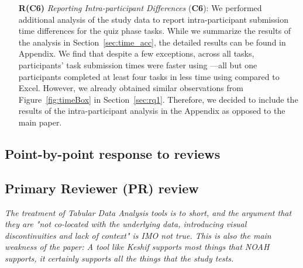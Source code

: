 \begin{itemize}
\item[\textbf{R(C6)}] \textit{Reporting Intra-participant Differences} (\textbf{C6}):
We performed additional analysis of the study data to report intra-participant submission time differences for the quiz phase tasks. While we summarize the results of the analysis in Section~\ref{sec:time_acc}, the detailed results can be found in Appendix. We find that despite a few exceptions, across all tasks, participants' task submission times were faster using \noah---all but one participants completed at least four tasks in less time using \noah compared to Excel. However, we already obtained similar observations from Figure~\ref{fig:timeBox} in Section~\ref{sec:rq1}. Therefore, we decided to include the results of the intra-participant analysis in the Appendix as opposed to the main paper.
\end{itemize}

\subsection*{Point-by-point response to reviews}

\subsection*{Primary Reviewer (PR) review}

 \textit{The
    treatment of Tabular Data Analysis tools is to short, and the argument that they
    are "not co-located with the underlying data, introducing visual discontinuities
    and lack of context" is IMO not true. This is also the main weakness of the paper: A tool like Keshif supports most things that NOAH supports, it certainly supports all the things that the study
    tests.} 
    
